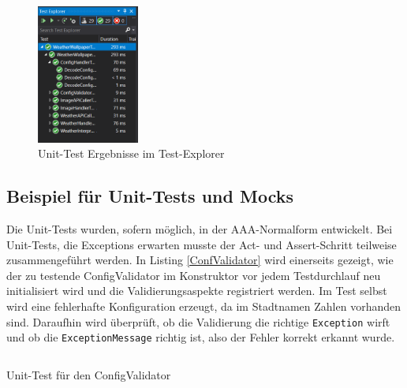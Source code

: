 \begin{figure}[ht]
\centering
\includegraphics[width=0.3\textwidth]{Bilder/TestExplorer}
\caption[Unit-Test Ergebnisse im Test-Explorer]{\label{TestExplorer} Unit-Test Ergebnisse im Test-Explorer}
\end{figure}



\subsection{Beispiel für Unit-Tests und Mocks}
Die Unit-Tests wurden, sofern möglich, in der AAA-Normalform entwickelt. Bei Unit-Tests, die Exceptions erwarten musste der Act- und Assert-Schritt teilweise zusammengeführt werden. In Listing \ref{ConfValidator} wird einerseits gezeigt, wie der zu testende ConfigValidator im Konstruktor vor jedem Testdurchlauf neu initialisiert wird und die Validierungsaspekte registriert werden. Im Test selbst wird eine fehlerhafte Konfiguration erzeugt, da im Stadtnamen Zahlen vorhanden sind. Daraufhin wird überprüft, ob die Validierung die richtige \texttt{Exception} wirft und ob die \texttt{ExceptionMessage} richtig ist, also der Fehler korrekt erkannt wurde.

\begin{listing}[h]
\inputminted[linenos=true,frame=lines, breaklines, breakbytokenanywhere]{csharp}{Listings/ConfigValidatorTest.cs}
\caption{Unit-Test für den ConfigValidator}
\label{ConfValidator}
\end{listing}

